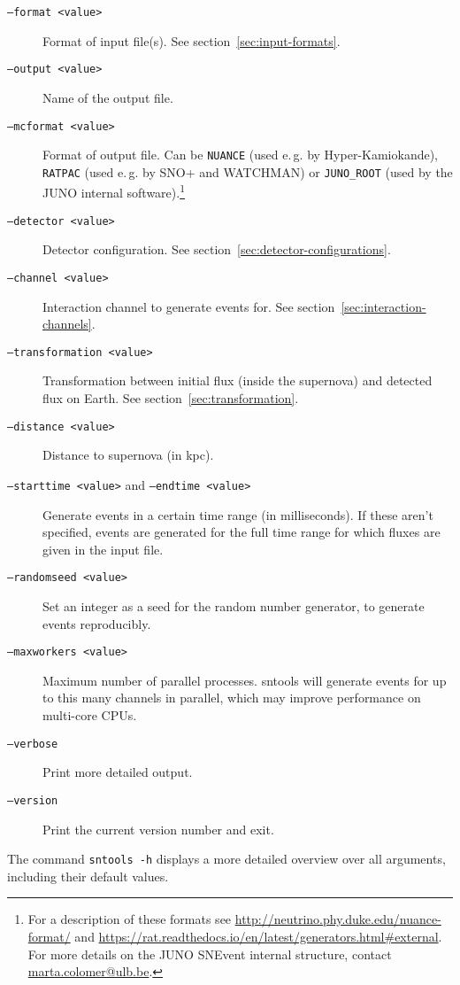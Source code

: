 \documentclass[11pt, oneside]{article}
\begin{document}
\begin{description}
\item[\texttt{--format <value>}] Format of input file(s). See section~\ref{sec:input-formats}.
\item[\texttt{--output <value>}] Name of the output file.
\item[\texttt{--mcformat <value>}] Format of output file. Can be \texttt{NUANCE} (used e.\,g. by Hyper-Kamiokande), \texttt{RATPAC} (used e.\,g. by SNO+ and WATCHMAN) or \texttt{JUNO\_ROOT} (used by the JUNO internal software).\footnote{For a description of these formats see \url{http://neutrino.phy.duke.edu/nuance-format/} and \url{https://rat.readthedocs.io/en/latest/generators.html\#external}. For more details on the JUNO SNEvent internal structure, contact \url{marta.colomer@ulb.be}.}

\item[\texttt{--detector <value>}] Detector configuration. See section~\ref{sec:detector-configurations}.
\item[\texttt{--channel <value>}] Interaction channel to generate events for. See section~\ref{sec:interaction-channels}.
\item[\texttt{--transformation <value>}] Transformation between initial flux (inside the supernova) and detected flux on Earth. See section~\ref{sec:transformation}.
\item[\texttt{--distance <value>}] Distance to supernova (in kpc).
\item[\texttt{--starttime <value>} and \texttt{--endtime <value>}] Generate events in a certain time range (in milliseconds). If these aren’t specified, events are generated for the full time range for which fluxes are given in the input file.
\item[\texttt{--randomseed <value>}] Set an integer as a seed for the random number generator, to generate events reproducibly.
\item[\texttt{--maxworkers <value>}] Maximum number of parallel processes. sntools will generate events for up to this many channels in parallel, which may improve performance on multi-core CPUs.
\item[\texttt{--verbose}] Print more detailed output.
\item[\texttt{--version}] Print the current version number and exit.
\end{description}

The command \texttt{sntools -h} displays a more detailed overview over all arguments, including their default values.
\end{document}
